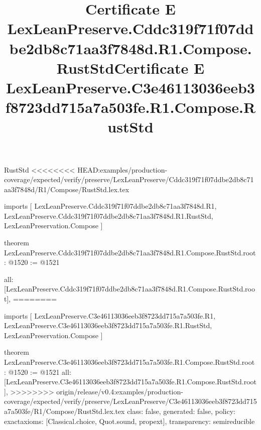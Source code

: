 \begin{lexlean}{RustStd}
<<<<<<<< HEAD:examples/production-coverage/expected/verify/preserve/LexLeanPreserve/Cddc319f71f07ddbe2db8c71aa3f7848d/R1/Compose/RustStd.lex.tex
\title{Certificate E LexLeanPreserve.Cddc319f71f07ddbe2db8c71aa3f7848d.R1.Compose.RustStd}
\begin{coremodule}
imports [
  LexLeanPreserve.Cddc319f71f07ddbe2db8c71aa3f7848d.R1,
  LexLeanPreserve.Cddc319f71f07ddbe2db8c71aa3f7848d.R1.RustStd,
  LexLeanPreservation.Compose
]

theorem LexLeanPreserve.Cddc319f71f07ddbe2db8c71aa3f7848d.R1.Compose.RustStd.root : @1520 := @1521 {
  all: [LexLeanPreserve.Cddc319f71f07ddbe2db8c71aa3f7848d.R1.Compose.RustStd.root],
========
\title{Certificate E LexLeanPreserve.C3e46113036eeb3f8723dd715a7a503fe.R1.Compose.RustStd}
\begin{coremodule}
imports [
  LexLeanPreserve.C3e46113036eeb3f8723dd715a7a503fe.R1,
  LexLeanPreserve.C3e46113036eeb3f8723dd715a7a503fe.R1.RustStd,
  LexLeanPreservation.Compose
]

theorem LexLeanPreserve.C3e46113036eeb3f8723dd715a7a503fe.R1.Compose.RustStd.root : @1520 := @1521 {
  all: [LexLeanPreserve.C3e46113036eeb3f8723dd715a7a503fe.R1.Compose.RustStd.root],
>>>>>>>> origin/release/v0.4:examples/production-coverage/expected/verify/preserve/LexLeanPreserve/C3e46113036eeb3f8723dd715a7a503fe/R1/Compose/RustStd.lex.tex
  class: false,
  generated: false,
  policy: exact{axioms: [Classical.choice, Quot.sound, propext]},
  transparency: semireducible
}


\end{coremodule}}
\end{coremodule}
\end{lexlean}
